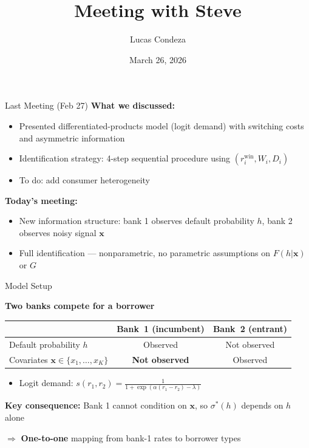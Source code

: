 \documentclass[10pt,aspectratio=169]{beamer}
\title{Meeting with Steve}
\author{Lucas Condeza\inst{1}}
\institute{\inst{1} Yale University}
\date{March 26, 2026}
\begin{document}
\begin{frame}{Last Meeting (Feb 27)}
\textbf{What we discussed:}
\begin{itemize}
    \item Presented differentiated-products model (logit demand) with switching costs and asymmetric information
    \item Identification strategy: 4-step sequential procedure using $(r_i^{\text{win}}, W_i, D_i)$
    \item To do:  add consumer heterogeneity
\end{itemize}

\vspace{0.3cm}
\textbf{Today's meeting:}
\begin{itemize}
    \item New information structure: bank 1 observes default probability $h$, bank 2 observes noisy signal  $\mathbf{x}$ 
    \item Full identification --- nonparametric, no parametric assumptions on $F(h|\mathbf{x})$ or $G$
\end{itemize}
\end{frame}


\begin{frame}{Model Setup}

\textbf{Two banks compete for a borrower} 
\begin{center}
\renewcommand{\arraystretch}{1.3}
\begin{tabular}{lcc}
\toprule
& \textbf{Bank~1 (incumbent)} & \textbf{Bank~2 (entrant)} \\
\midrule
Default probability $h$ & Observed & Not observed \\
Covariates $\mathbf{x}\in \{x_1, \ldots, x_K\}$ & \textbf{Not observed} & Observed \\
\bottomrule
\end{tabular}
\end{center}

\begin{itemize}

    \item Logit demand: $s(r_1, r_2) = \frac{1}{1 + \exp(\alpha(r_1 - r_2) - \lambda)}$
\end{itemize}

\vspace{0.2cm}
\textbf{Key consequence:} Bank 1 cannot condition on $\mathbf{x}$, so $\sigma^*(h)$ depends on $h$ alone

$\Rightarrow$ \textbf{One-to-one} mapping from bank-1 rates to borrower types
\end{frame}
\end{document}
